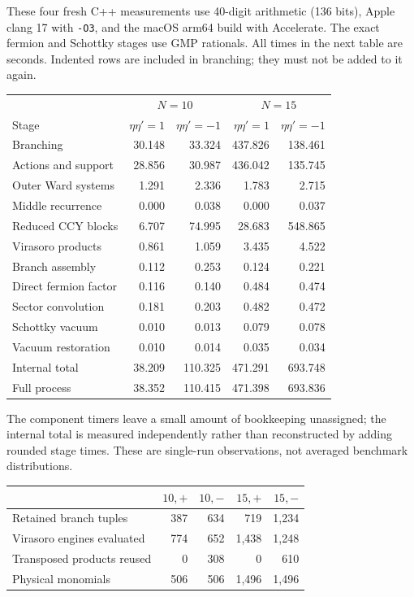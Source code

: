 These four fresh C++ measurements use 40-digit arithmetic (136 bits),
Apple clang 17 with \texttt{-O3}, and the macOS arm64 build with Accelerate.
The exact fermion and Schottky stages use GMP rationals.
All times in the next table are seconds. Indented rows are included in
branching; they must not be added to it again.
\begin{center}
\begin{tabular}{lrrrr}
\toprule
& \multicolumn{2}{c}{$N=10$} & \multicolumn{2}{c}{$N=15$}\\
Stage & $\eta\eta'=1$ & $\eta\eta'=-1$ & $\eta\eta'=1$ & $\eta\eta'=-1$\\
\midrule
Branching & 30.148 & 33.324 & 437.826 & 138.461\\
\quad Actions and support & 28.856 & 30.987 & 436.042 & 135.745\\
\quad Outer Ward systems & 1.291 & 2.336 & 1.783 & 2.715\\
Middle recurrence & 0.000 & 0.038 & 0.000 & 0.037\\
Reduced CCY blocks & 6.707 & 74.995 & 28.683 & 548.865\\
Virasoro products & 0.861 & 1.059 & 3.435 & 4.522\\
Branch assembly & 0.112 & 0.253 & 0.124 & 0.221\\
Direct fermion factor & 0.116 & 0.140 & 0.484 & 0.474\\
Sector convolution & 0.181 & 0.203 & 0.482 & 0.472\\
Schottky vacuum & 0.010 & 0.013 & 0.079 & 0.078\\
Vacuum restoration & 0.010 & 0.014 & 0.035 & 0.034\\
\midrule
Internal total & 38.209 & 110.325 & 471.291 & 693.748\\
Full process & 38.352 & 110.415 & 471.398 & 693.836\\
\bottomrule
\end{tabular}
\end{center}
The component timers leave a small amount of bookkeeping unassigned;
the internal total is measured independently rather than reconstructed
by adding rounded stage times. These are single-run observations,
not averaged benchmark distributions.
\begin{center}
\begin{tabular}{lrrrr}
\toprule
& $10,+$ & $10,-$ & $15,+$ & $15,-$\\
\midrule
Retained branch tuples & 387 & 634 & 719 & 1,234\\
Virasoro engines evaluated & 774 & 652 & 1,438 & 1,248\\
Transposed products reused & 0 & 308 & 0 & 610\\
Physical monomials & 506 & 506 & 1,496 & 1,496\\
\bottomrule
\end{tabular}
\end{center}
